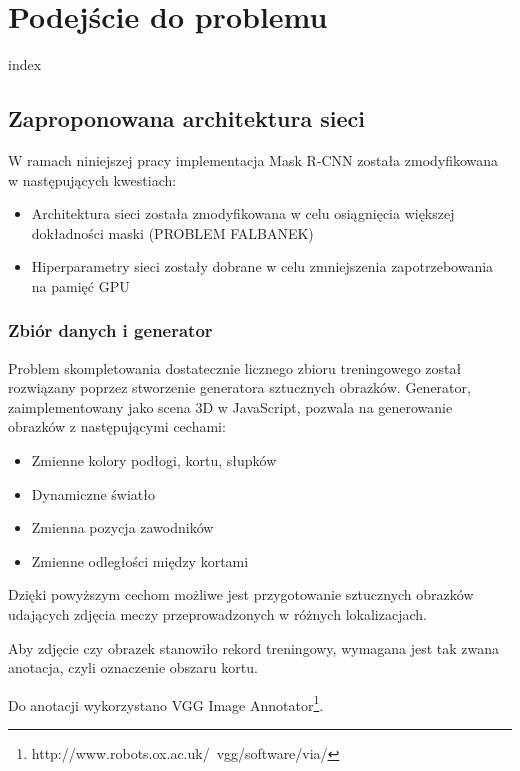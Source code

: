 \chapter{Podejście do problemu}

{index}

\section{Zaproponowana architektura sieci}
\label{sec:zaproponowana_architektura}

W ramach niniejszej pracy implementacja Mask R-CNN została zmodyfikowana w następujących kwestiach:

\begin{itemize}
	\item Architektura sieci została zmodyfikowana w celu osiągnięcia większej dokładności maski (PROBLEM FALBANEK)
	\item Hiperparametry sieci zostały dobrane w celu zmniejszenia zapotrzebowania na pamięć GPU
\end{itemize}


\subsection{Zbiór danych i generator}
\label{sec:generator}

Problem skompletowania dostatecznie licznego zbioru treningowego został rozwiązany poprzez stworzenie generatora sztucznych obrazków. Generator, zaimplementowany jako scena 3D w JavaScript, pozwala na generowanie obrazków z następującymi cechami:

\begin{itemize}
	\item Zmienne kolory podłogi, kortu, słupków
	\item Dynamiczne światło
	\item Zmienna pozycja zawodników
	\item Zmienne odległości między kortami
\end{itemize}

Dzięki powyższym cechom możliwe jest przygotowanie sztucznych obrazków udających zdjęcia meczy przeprowadzonych w różnych lokalizacjach.

Aby zdjęcie czy obrazek stanowiło rekord treningowy, wymagana jest tak zwana anotacja, czyli oznaczenie obszaru kortu.

Do anotacji wykorzystano VGG Image Annotator\footnote{http://www.robots.ox.ac.uk/~vgg/software/via/}.
\\

